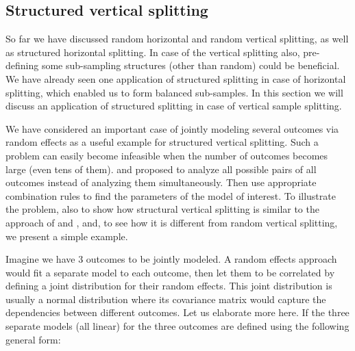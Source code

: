\documentclass[11pt,a5paper,twoside]{book}
\begin{document}
\subsection{Structured vertical splitting} 

So far we have discussed random horizontal and random vertical splitting, as well as structured horizontal splitting. In case of the vertical splitting also, pre-defining some sub-sampling structures (other than random) could be beneficial. We have already seen one application of structured splitting in case of horizontal splitting, which enabled us to form balanced sub-samples. In this section we will discuss an application of structured splitting in case of vertical sample splitting.

We have considered an important case of jointly modeling several outcomes via random effects as a useful example for structured vertical splitting. Such a problem can easily become infeasible when the number of outcomes becomes large (even tens of them). \cite{Verbeke2006} and \cite{Verbeke2007} proposed to analyze all possible pairs of all outcomes instead of analyzing them simultaneously. Then use appropriate combination rules to find the parameters of the model of interest. To illustrate the problem, also to show how structural vertical splitting is similar to the approach of \cite{Verbeke2006} and \cite{Verbeke2007}, and, to see how it is different from random vertical splitting, we present a simple example. 

Imagine we have 3 outcomes to be jointly modeled. A random effects approach would fit a separate model to each outcome, then let them to be correlated by defining a joint distribution for their random effects. This joint distribution is usually a normal distribution where its covariance matrix would capture the dependencies between different outcomes. Let us elaborate more here. If the three separate models (all linear) for the three outcomes are defined using the following general form:
\end{document}
